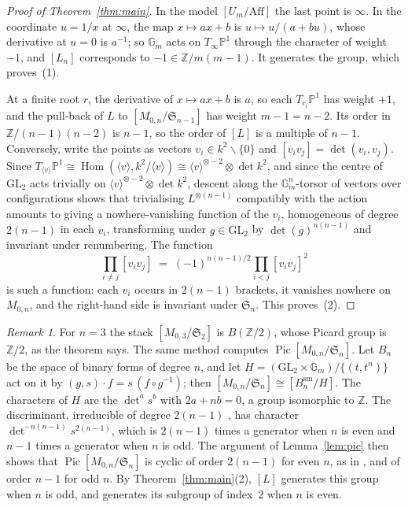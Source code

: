 \documentclass[11pt,a4paper]{amsart}
\theoremstyle{remark}
\newtheorem{remark}[theorem]{Remark}
\newcommand{\M}{M_{0,n}}
\newcommand{\Sn}{\mathfrak S}
\newcommand{\Pic}{\operatorname{Pic}}
\newcommand{\Aff}{\mathrm{Aff}}
\newcommand{\Gm}{\mathbb G_m}
\newcommand{\PP}{\mathbb P^1}
\begin{document}
\begin{proof}[Proof of Theorem~\ref{thm:main}]
In the model $[U_m/\Aff]$ the last point is $\infty$. In the coordinate $u = 1/x$ at $\infty$, the map $x \mapsto ax + b$ is $u \mapsto u/(a + bu)$, whose derivative at $u = 0$ is $a^{-1}$; so $\Gm$ acts on $T_\infty\PP$ through the character of weight $-1$, and $[L_n]$ corresponds to $-1 \in \mathbb Z/m(m-1)$. It generates the group, which proves~(1).

At a finite root $r$, the derivative of $x \mapsto ax + b$ is $a$, so each $T_{r_i}\PP$ has weight $+1$, and the pull-back of $L$ to $[\M/\Sn_{n-1}]$ has weight $m - 1 = n - 2$. Its order in $\mathbb Z/(n-1)(n-2)$ is $n - 1$, so the order of $[L]$ is a multiple of $n - 1$. Conversely, write the points as vectors $v_i \in k^2 \smallsetminus \{0\}$ and $[v_iv_j] = \det(v_i, v_j)$. Since $T_{\langle v\rangle}\PP \cong \operatorname{Hom}(\langle v\rangle, k^2/\langle v\rangle) \cong \langle v\rangle^{\otimes -2} \otimes \det k^2$, and since the centre of $\mathrm{GL}_2$ acts trivially on $\langle v\rangle^{\otimes -2} \otimes \det k^2$, descent along the $\Gm^n$-torsor of vectors over configurations shows that trivialising $L^{\otimes(n-1)}$ compatibly with the action amounts to giving a nowhere-vanishing function of the $v_i$, homogeneous of degree $2(n-1)$ in each $v_i$, transforming under $g \in \mathrm{GL}_2$ by $\det(g)^{n(n-1)}$ and invariant under renumbering. The function
\[
\prod_{i \ne j}[v_iv_j] \;=\; (-1)^{n(n-1)/2}\prod_{i<j}[v_iv_j]^2
\]
is such a function: each $v_i$ occurs in $2(n-1)$ brackets, it vanishes nowhere on $\M$, and the right-hand side is invariant under $\Sn_n$. This proves~(2).
\end{proof}

\begin{remark}\label{rem:sn}
For $n = 3$ the stack $[M_{0,3}/\Sn_2]$ is $B(\mathbb Z/2)$, whose Picard group is $\mathbb Z/2$, as the theorem says. The same method computes $\Pic[\M/\Sn_n]$. Let $B_n$ be the space of binary forms of degree $n$, and let $H = (\mathrm{GL}_2 \times \Gm)/\{(t, t^n)\}$ act on it by $(g, s)\cdot f = s\,(f \circ g^{-1})$; then $[\M/\Sn_n] \cong [B_n^{\mathrm{sm}}/H]$. The characters of $H$ are the $\det^a s^b$ with $2a + nb = 0$, a group isomorphic to $\mathbb Z$. The discriminant, irreducible of degree $2(n-1)$ \cite[\S5]{arsievistoli2004}, has character $\det^{-n(n-1)} s^{2(n-1)}$, which is $2(n-1)$ times a generator when $n$ is even and $n-1$ times a generator when $n$ is odd. The argument of Lemma~\ref{lem:pic} then shows that $\Pic[\M/\Sn_n]$ is cyclic of order $2(n-1)$ for even $n$, as in \cite[Th.~3.6]{gorchinskiyviviani2008}, and of order $n-1$ for odd $n$. By Theorem~\ref{thm:main}(2), $[L]$ generates this group when $n$ is odd, and generates its subgroup of index~$2$ when $n$ is even.
\end{remark}
\end{document}
